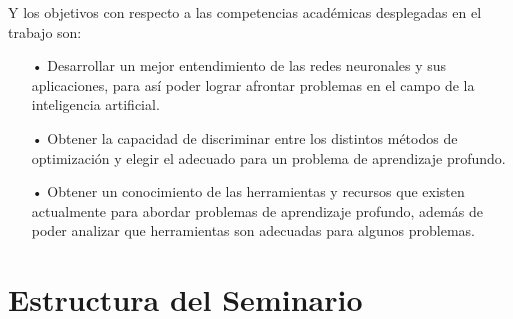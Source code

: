 Y los objetivos con respecto a las competencias académicas desplegadas en el trabajo son:
\begin{itemize}
\item[•] Desarrollar un mejor entendimiento de las redes neuronales y sus aplicaciones, para así poder lograr afrontar problemas en el campo de la inteligencia artificial. %
\item[•] Obtener la capacidad de discriminar entre los distintos métodos de optimización y elegir el adecuado para un problema de aprendizaje profundo.%
\item[•] Obtener un conocimiento de las herramientas y recursos que existen actualmente para abordar problemas de aprendizaje profundo, además de poder analizar que herramientas son adecuadas para algunos problemas.
\end{itemize}

\section{Estructura del Seminario}


